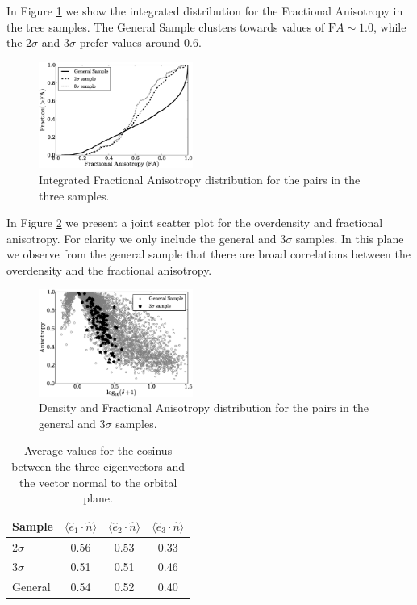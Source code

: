 \documentclass{emulateapj}
\begin{document}
In Figure \ref{fig:FA} we show the integrated distribution for the
Fractional Anisotropy in the tree samples. The General Sample clusters
towards values of ${\mathrm FA}\sim 1.0$, while the $2\sigma$ and
$3\sigma$ prefer values around $0.6$.

\begin{figure}
\begin{center}
  \includegraphics[width=0.45\textwidth]{FA_histogram.eps}
\end{center}
\caption{Integrated Fractional Anisotropy distribution for the pairs
  in the three samples. 
    \label{fig:FA}}  
\end{figure}

In Figure \ref{fig:delta_FA} we present a joint scatter plot for the
overdensity and fractional anisotropy. For clarity we only include the
general and $3\sigma$ samples. In this plane we observe from the general
sample that there are broad correlations between the overdensity and
the fractional anisotropy. 




\begin{figure}
\begin{center}
  \includegraphics[width=0.45\textwidth]{FA_delta_scatter.eps}
\end{center}
\caption{Density and Fractional Anisotropy distribution for the pairs
  in the general and $3\sigma$ samples. 
    \label{fig:delta_FA}}  
\end{figure}


\begin{table}
\begin{center}
\begin{tabular}{lccc}\hline\hline
Sample & $\langle\hat{e}_1\cdot \hat{n}\rangle$ & $\langle\hat{e}_2\cdot \hat{n}\rangle$ & $\langle\hat{e}_3\cdot \hat{n}\rangle$\\\hline
2$\sigma$ & 0.56 & 0.53 &  0.33\\
3$\sigma$ & 0.51 & 0.51 &  0.46\\
General & 0.54 & 0.52 & 0.40\\\hline
\end{tabular}
\caption{Average values for the cosinus between the three eigenvectors and the vector normal to the orbital plane.
\label{table:mu}}
\end{center}
\end{table}
\end{document}

